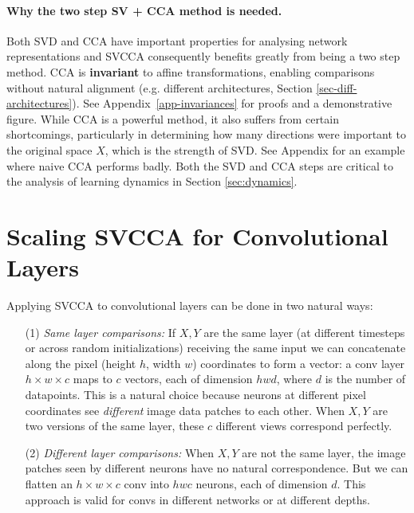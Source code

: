 \documentclass{article} %
\begin{document}
\paragraph{Why the two step SV + CCA method is needed.}
\label{sec-cca-invariances}
Both SVD and CCA have important properties for analysing network representations and SVCCA consequently benefits greatly from being a two step method. CCA is \textbf{invariant} to affine transformations,
enabling comparisons without natural alignment (e.g. different architectures, Section \ref{sec-diff-architectures}). See Appendix~\ref{app-invariances} for proofs and a demonstrative figure. While CCA is a powerful method, it also suffers from certain shortcomings, particularly in determining how many directions were important to the original space $X$, which is the strength of SVD. See Appendix for an example where naive CCA performs badly. 
Both the SVD and CCA steps are critical to the analysis of learning dynamics in Section \ref{sec:dynamics}.



\section{Scaling SVCCA for Convolutional Layers}
\label{sec:scaling_svcca}

Applying SVCCA to convolutional layers can be done in two natural ways:
\begin{enumerate}
\item[(1)] \textit{Same layer comparisons:} If $X, Y$ are the same layer (at different timesteps or across random initializations) receiving the same input we can concatenate along the pixel (height $h$, width $w$) coordinates to form a vector: a conv layer $h \times w \times c$ maps to $c$ vectors, each of dimension $hwd$, where $d$ is the number of datapoints. This is a natural choice because neurons at different pixel coordinates see \textit{different} image data patches to each other. When $X, Y$ are two versions of the same layer, these $c$ different views correspond perfectly. 

\item[(2)]\textit{Different layer comparisons:} When $X, Y$ are not the same layer, the image patches seen by different neurons have no natural correspondence. But we can flatten an $h \times w \times c$ conv into $h w c$ neurons, each of dimension $d$. This approach is valid for convs in different networks or at different depths.%

\end{enumerate}
\end{document}

